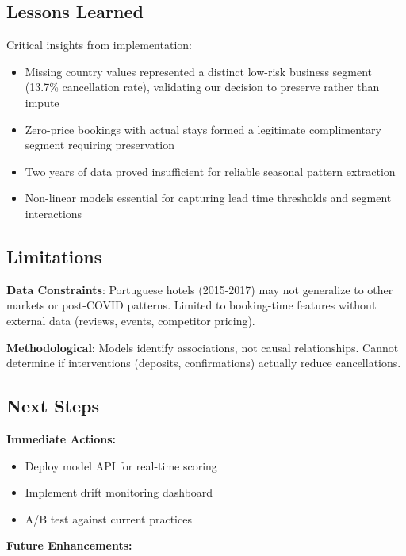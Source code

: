 \documentclass[
  letterpaper,
  DIV=11,
  numbers=noendperiod]{scrartcl}
\providecommand{\tightlist}{%
  \setlength{\itemsep}{0pt}\setlength{\parskip}{0pt}}
\begin{document}
\subsection{Lessons Learned}\label{lessons-learned}

Critical insights from implementation:

\begin{itemize}
\tightlist
\item
  Missing country values represented a distinct low-risk business
  segment (13.7\% cancellation rate), validating our decision to
  preserve rather than impute
\item
  Zero-price bookings with actual stays formed a legitimate
  complimentary segment requiring preservation
\item
  Two years of data proved insufficient for reliable seasonal pattern
  extraction
\item
  Non-linear models essential for capturing lead time thresholds and
  segment interactions
\end{itemize}

\subsection{Limitations}\label{limitations}

\textbf{Data Constraints}: Portuguese hotels (2015-2017) may not
generalize to other markets or post-COVID patterns. Limited to
booking-time features without external data (reviews, events, competitor
pricing).

\textbf{Methodological}: Models identify associations, not causal
relationships. Cannot determine if interventions (deposits,
confirmations) actually reduce cancellations.

\subsection{Next Steps}\label{next-steps}

\textbf{Immediate Actions:}

\begin{itemize}
\tightlist
\item
  Deploy model API for real-time scoring
\item
  Implement drift monitoring dashboard
\item
  A/B test against current practices
\end{itemize}

\textbf{Future Enhancements:}
\end{document}
